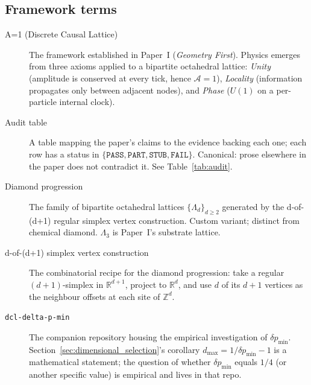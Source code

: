 
\label{sec:terms}


\subsection*{Framework terms}

\begin{description}
\item[A=1 (Discrete Causal Lattice)]
   The framework established in Paper~I (\emph{Geometry First}).
   Physics emerges from three axioms applied to a bipartite octahedral
   lattice: \emph{Unity} (amplitude is conserved at every tick, hence
   $\mathcal{A} = 1$), \emph{Locality} (information propagates only
   between adjacent nodes), and \emph{Phase} ($U(1)$ on a per-particle
   internal clock).

\item[Audit table]
   A table mapping the paper's claims to the evidence backing each
   one; each row has a status in
   $\{\texttt{PASS}, \texttt{PART}, \texttt{STUB}, \texttt{FAIL}\}$.
   Canonical: prose elsewhere in the paper does not contradict it.
   See Table~\ref{tab:audit}.

\item[Diamond progression]
   The family of bipartite octahedral lattices $\{\Lambda_d\}_{d \geq 2}$
   generated by the d-of-(d+1) regular simplex vertex construction.
   Custom variant; distinct from chemical diamond.  $\Lambda_3$ is
   Paper~I's substrate lattice.

\item[d-of-(d+1) simplex vertex construction]
   The combinatorial recipe for the diamond progression: take a
   regular $(d+1)$-simplex in $\mathbb{R}^{d+1}$, project to
   $\mathbb{R}^d$, and use $d$ of its $d+1$ vertices as the
   neighbour offsets at each site of $\mathbb{Z}^d$.

\item[\texttt{dcl-delta-p-min}]
   The companion repository housing the empirical investigation of
   $\delta p_\min$.  Section~\ref{sec:dimensional_selection}'s
   corollary $d_\max = 1/\delta p_\min - 1$ is a mathematical
   statement; the question of whether $\delta p_\min$ equals $1/4$
   (or another specific value) is empirical and lives in that repo.


\end{description}

